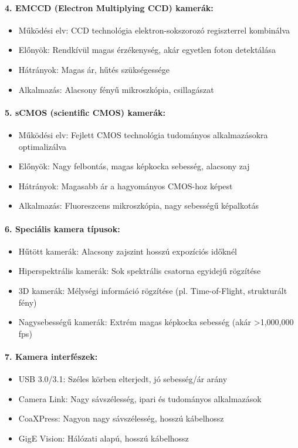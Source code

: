 \documentclass[a4paper,12pt]{article}
\begin{document}
\paragraph{4. EMCCD (Electron Multiplying CCD) kamerák:} \begin{itemize} \item Működési elv: CCD technológia elektron-sokszorozó regiszterrel kombinálva \item Előnyök: Rendkívül magas érzékenység, akár egyetlen foton detektálása \item Hátrányok: Magas ár, hűtés szükségessége \item Alkalmazás: Alacsony fényű mikroszkópia, csillagászat \end{itemize}

\paragraph{5. sCMOS (scientific CMOS) kamerák:} \begin{itemize} \item Működési elv: Fejlett CMOS technológia tudományos alkalmazásokra optimalizálva \item Előnyök: Nagy felbontás, magas képkocka sebesség, alacsony zaj \item Hátrányok: Magasabb ár a hagyományos CMOS-hoz képest \item Alkalmazás: Fluoreszcens mikroszkópia, nagy sebességű képalkotás \end{itemize}

\paragraph{6. Speciális kamera típusok:} \begin{itemize} \item Hűtött kamerák: Alacsony zajszint hosszú expozíciós időknél \item Hiperspektrális kamerák: Sok spektrális csatorna egyidejű rögzítése \item 3D kamerák: Mélységi információ rögzítése (pl. Time-of-Flight, strukturált fény) \item Nagysebességű kamerák: Extrém magas képkocka sebesség (akár >1,000,000 fps) \end{itemize}

\paragraph{7. Kamera interfészek:} \begin{itemize} \item USB 3.0/3.1: Széles körben elterjedt, jó sebesség/ár arány \item Camera Link: Nagy sávszélesség, ipari és tudományos alkalmazások \item CoaXPress: Nagyon nagy sávszélesség, hosszú kábelhossz \item GigE Vision: Hálózati alapú, hosszú kábelhossz \end{itemize}
\end{document}
